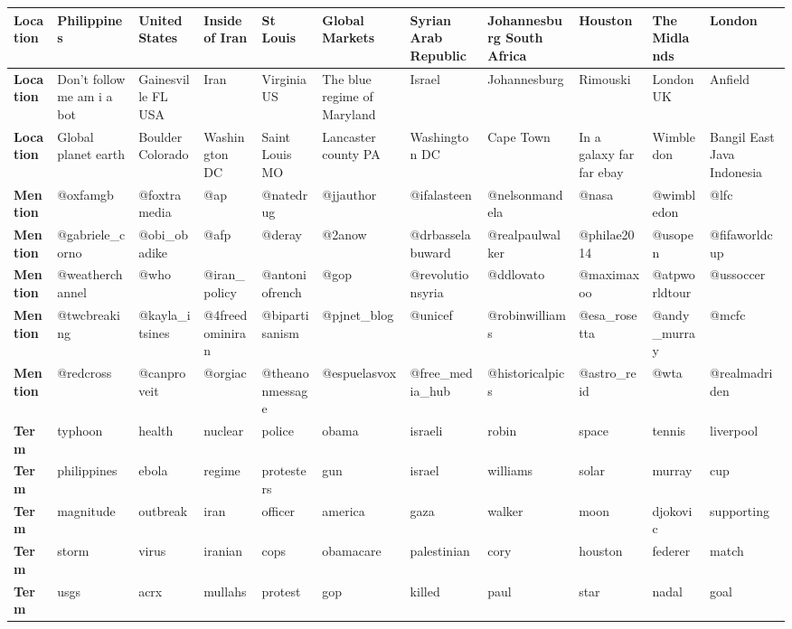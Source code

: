 \begin{table}[t!]
{{\begin{tabular}{|l|l|l|l|l|l|l|l|l|l|l|}
\hline 
\textbf{Location} & Philippines & United States & Inside of Iran & St Louis & Global Markets & Syrian Arab Republic & Johannesburg South Africa & Houston & The Midlands & London\tabularnewline
\hline 
\textbf{Location} & Don't follow me am i a bot & Gainesville FL USA & Iran & Virginia US & The blue regime of Maryland & Israel & Johannesburg & Rimouski & London UK & Anfield\tabularnewline
\hline 
\textbf{Location} & Global planet earth & Boulder Colorado & Washington DC & Saint Louis MO & Lancaster county PA & Washington DC & Cape Town & In a galaxy far far ebay & Wimbledon & Bangil East Java Indonesia\tabularnewline
\hline 
\hline 
\textbf{Mention} & @oxfamgb & @foxtramedia & @ap & @natedrug & @jjauthor & @ifalasteen & @nelsonmandela & @nasa & @wimbledon & @lfc\tabularnewline
\hline 
\textbf{Mention} & @gabriele\_corno & @obi\_obadike & @afp & @deray & @2anow & @drbasselabuward & @realpaulwalker & @philae2014 & @usopen & @fifaworldcup\tabularnewline
\hline 
\textbf{Mention} & @weatherchannel & @who & @iran\_policy & @antoniofrench & @gop & @revolutionsyria & @ddlovato & @maximaxoo & @atpworldtour & @ussoccer\tabularnewline
\hline 
\textbf{Mention} & @twcbreaking & @kayla\_itsines & @4freedominiran & @bipartisanism & @pjnet\_blog & @unicef & @robinwilliams & @esa\_rosetta & @andy\_murray & @mcfc\tabularnewline
\hline 
\textbf{Mention} & @redcross & @canproveit & @orgiac & @theanonmessage & @espuelasvox & @free\_media\_hub & @historicalpics & @astro\_reid & @wta & @realmadriden\tabularnewline
\hline 
\hline 
\textbf{Term} & typhoon & health & nuclear & police & obama & israeli & robin & space & tennis & liverpool\tabularnewline
\hline 
\textbf{Term} & philippines & ebola & regime & protesters & gun & israel & williams & solar & murray & cup\tabularnewline
\hline 
\textbf{Term} & magnitude & outbreak & iran & officer & america & gaza & walker & moon & djokovic & supporting\tabularnewline
\hline 
\textbf{Term} & storm & virus & iranian  & cops & obamacare & palestinian & cory & houston & federer & match\tabularnewline
\hline 
\textbf{Term} & usgs & acrx & mullahs & protest & gop & killed & paul & star & nadal & goal\tabularnewline
\hline 
\end{tabular}

}}
\label{table:top10MItopicsLocations}
\end{table}







%

